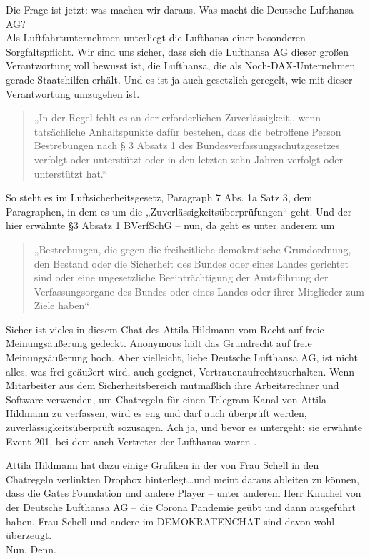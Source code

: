 Die Frage ist jetzt: was machen wir daraus. Was macht die Deutsche
Lufthansa AG?\\

Als Luftfahrtunternehmen unterliegt die Lufthansa einer besonderen
Sorgfaltspflicht. Wir sind uns sicher, dass sich die Lufthansa AG
dieser großen Verantwortung voll bewusst ist, die Lufthansa, die als
Noch-DAX-Unternehmen gerade Staatshilfen erhält. Und es ist ja
auch gesetzlich geregelt, wie mit dieser Verantwortung umzugehen
ist.
\begin{quote}
  „In der Regel fehlt es an der erforderlichen Zuverlässigkeit,\newline
  [...]. wenn tatsächliche Anhaltspunkte dafür bestehen, dass die betroffene Person Bestrebungen nach § 3 Absatz 1 des Bundesverfassungsschutzgesetzes verfolgt oder unterstützt oder in den letzten zehn Jahren verfolgt oder unterstützt hat.“
\end{quote}
So steht es im Luftsicherheitsgesetz, Paragraph 7 Abs. 1a Satz 3\autocite{19}, dem Paragraphen, in dem es um die „Zuverlässigkeitsüberprüfungen“ geht. Und der hier erwähnte §3 Absatz 1 BVerfSchG – nun, da geht es unter anderem um

\begin{quote}
  „Bestrebungen, die gegen die freiheitliche demokratische Grundordnung, den Bestand oder die Sicherheit des Bundes oder eines Landes gerichtet sind oder eine ungesetzliche Beeinträchtigung der Amtsführung der Verfassungsorgane des Bundes oder eines Landes oder ihrer Mitglieder zum Ziele haben“\autocite{20}
\end{quote}
Sicher ist vieles in diesem Chat des Attila Hildmann vom Recht auf freie Meinungsäußerung gedeckt. Anonymous hält das Grundrecht auf freie Meinungsäußerung hoch. Aber vielleicht, liebe Deutsche Lufthansa AG, ist nicht alles, was frei geäußert wird, auch geeignet, Vertrauenaufrechtzuerhalten. Wenn Mitarbeiter aus dem Sicherheitsbereich mutmaßlich ihre Arbeitsrechner und Software verwenden, um Chatregeln für einen Telegram-Kanal von Attila Hildmann zu verfassen, wird es eng und darf auch überprüft werden, zuverlässigkeitsüberprüft sozusagen. Ach ja, und bevor es untergeht: sie erwähnte Event 201, bei dem auch Vertreter der Lufthansa waren \autocite{21} \autocite{22}.

\newpage
Attila Hildmann hat dazu einige Grafiken in der von Frau Schell in den Chatregeln verlinkten Dropbox \autocite{23}
hinterlegt\dots und meint daraus ableiten zu können, dass die Gates Foundation und andere Player – unter anderem Herr Knuchel von der Deutsche Lufthansa AG – die Corona Pandemie geübt und dann ausgeführt haben. Frau Schell und andere im DEMOKRATENCHAT sind davon wohl überzeugt. \\

Nun. Denn.
